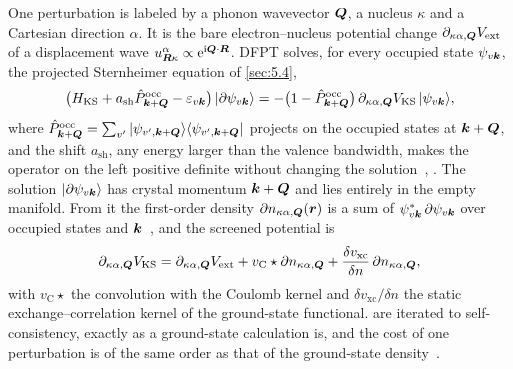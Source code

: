 One perturbation is labeled by a phonon wavevector $\bm{Q}$, a nucleus $\kappa$ and a Cartesian direction $\alpha$. It is the bare electron--nucleus potential change $\partial_{\kappa\alpha,\bm{Q}}V_{\mathrm{ext}}$ of a displacement wave $u^\alpha_{\bm{R}\kappa} \propto \mathrm{e}^{\mathrm{i}\bm{Q}\cdot\bm{R}}$. DFPT solves, for every occupied state $\psi_{v\bm{k}}$, the projected Sternheimer equation of \cref{sec:5.4},
\begin{equation}
  \bigl(H_{\mathrm{KS}} + a_{\mathrm{sh}}\hat{P}^{\mathrm{occ}}_{\bm{k}+\bm{Q}} - \varepsilon_{v\bm{k}}\bigr)\,|\partial\psi_{v\bm{k}}\rangle
  = -\bigl(1 - \hat{P}^{\mathrm{occ}}_{\bm{k}+\bm{Q}}\bigr)\,\partial_{\kappa\alpha,\bm{Q}}V_{\mathrm{KS}}\,|\psi_{v\bm{k}}\rangle ,
  \label{eq:E.4-sth}
\end{equation}
where $\hat{P}^{\mathrm{occ}}_{\bm{k}+\bm{Q}} = \sum_{v'}|\psi_{v',\bm{k}+\bm{Q}}\rangle\langle\psi_{v',\bm{k}+\bm{Q}}|$ projects on the occupied states at $\bm{k}+\bm{Q}$, and the shift $a_{\mathrm{sh}}$, any energy larger than the valence bandwidth, makes the operator on the left positive definite without changing the solution~\cite[Eqs.~(30)--(31)]{baroni2001phonons}, \cite[Eq.~(48)]{giustino2017electron}. The solution $|\partial\psi_{v\bm{k}}\rangle$ has crystal momentum $\bm{k}+\bm{Q}$ and lies entirely in the empty manifold. From it the first-order density $\partial n_{\kappa\alpha,\bm{Q}}(\bm{r})$ is a sum of $\psi^*_{v\bm{k}}\,\partial\psi_{v\bm{k}}$ over occupied states and $\bm{k}$~\cite[Eq.~(49)]{giustino2017electron}, and the screened potential is
\begin{equation}
  \partial_{\kappa\alpha,\bm{Q}}V_{\mathrm{KS}} = \partial_{\kappa\alpha,\bm{Q}}V_{\mathrm{ext}} + v_{\mathrm{C}}\star\partial n_{\kappa\alpha,\bm{Q}} + \frac{\delta v_{\mathrm{xc}}}{\delta n}\,\partial n_{\kappa\alpha,\bm{Q}} ,
  \label{eq:E.4-dV}
\end{equation}
with $v_{\mathrm{C}}\star$ the convolution with the Coulomb kernel and $\delta v_{\mathrm{xc}}/\delta n$ the static exchange--correlation kernel of the ground-state functional.  are iterated to self-consistency, exactly as a ground-state calculation is, and the cost of one perturbation is of the same order as that of the ground-state density~\cite[Sect.~II.C]{baroni2001phonons}.

